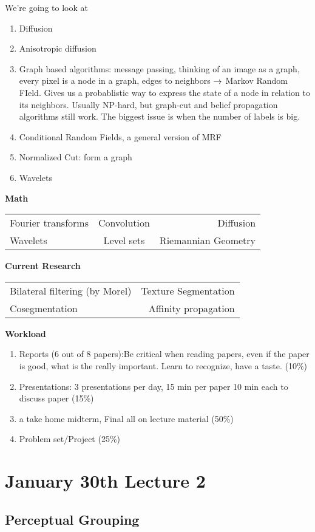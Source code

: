 We're going to look at
\begin{enumerate}
\item Diffusion
\item Anisotropic diffusion
\item Graph based algorithms: message passing, thinking of an image as
  a graph, every pixel is a node in a graph, edges to neighbors
  $\rightarrow$ Markov Random FIeld. Gives us a probablistic way to express
  the state of a node in relation to its neighbors. Usually NP-hard, but graph-cut and
  belief propagation algorithms still work. The biggest issue is when
  the number of labels is big.
\item Conditional Random Fields, a general version of MRF
\item Normalized Cut: form a graph
\item Wavelets
\end{enumerate}

\textbf{Math}
\begin{tabular}{l c r}
Fourier transforms &  Convolution & Diffusion\\
Wavelets & Level sets & Riemannian Geometry  \\
\end{tabular}

\textbf{Current Research}
\begin{tabular}{l r}
Bilateral filtering (by Morel) & Texture Segmentation\\
Cosegmentation & Affinity propagation\\
\end{tabular}

\textbf{Workload}
\begin{enumerate}
\item Reports (6 out of 8 papers):Be critical when reading papers, even if the paper is good, what is
the really important. Learn to recognize, have a taste. (10\%)
\item Presentations: 3 presentations per day, 15 min per paper 10 min
  each to discuss paper (15\%)
\item a take home midterm, Final all on lecture material (50\%)
\item Problem set/Project (25\%)
\end{enumerate}

\section{January 30th Lecture 2}

\subsection{Perceptual Grouping}

